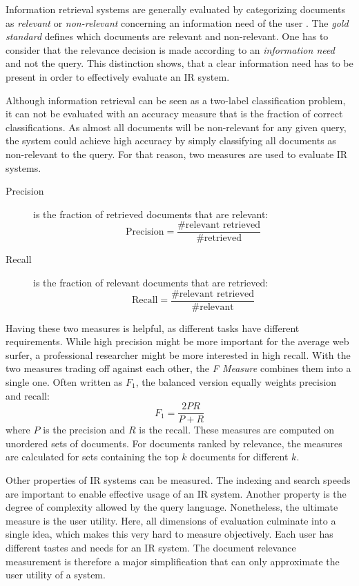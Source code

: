 \documentclass[../main.tex]{subfiles}
\begin{document}
Information retrieval systems are generally evaluated by categorizing documents
as \emph{relevant} or \emph{non-relevant} concerning an information need of the user \cite{Manning2009}.
The \emph{gold standard} defines which documents are relevant and non-relevant.
One has to consider that the relevance decision is made according to an \emph{information need} and not the query.
This distinction shows,
that a clear information need has to be present in order to effectively evaluate an IR system.

Although information retrieval can be seen as a two-label classification problem,
it can not be evaluated with an accuracy measure
that is the fraction of correct classifications.
As almost all documents will be non-relevant for any given query,
the system could achieve high accuracy by simply classifying all documents
as non-relevant to the query.
For that reason, two measures are used to evaluate IR systems.
\begin{description}
    \item[Precision] is the fraction of retrieved documents that are relevant:
        \begin{equation}
            \text{Precision} = \frac{\text{\#relevant retrieved}}{\text{\#retrieved}}
        \end{equation}
    \item[Recall] is the fraction of relevant documents that are retrieved:
        \begin{equation}
            \text{Recall} = \frac{\text{\#relevant retrieved}}{\text{\#relevant}}
        \end{equation}
\end{description}
Having these two measures is helpful, as different tasks have different requirements.
While high precision might be more important for the average web surfer,
a professional researcher might be more interested in high recall.
With the two measures trading off against each other, the \emph{F Measure} combines
them into a single one.
Often written as $F_1$, the balanced version equally weights precision and recall:
\begin{equation}
    F_1 = \frac{2PR}{P+R}
\end{equation}
where $P$ is the precision and $R$ is the recall.
These measures are computed on unordered sets of documents.
For documents ranked by relevance,
the measures are calculated for sets containing the top $k$ documents for different $k$.

Other properties of IR systems can be measured.
The indexing and search speeds are important to enable effective usage of an IR system.
Another property is the degree of complexity allowed by the query language.
Nonetheless, the ultimate measure is the user utility.
Here, all dimensions of evaluation culminate into a single idea,
which makes this very hard to measure objectively.
Each user has different tastes and needs for an IR system.
The document relevance measurement is therefore a major simplification that can only
approximate the user utility of a system.
\end{document}
